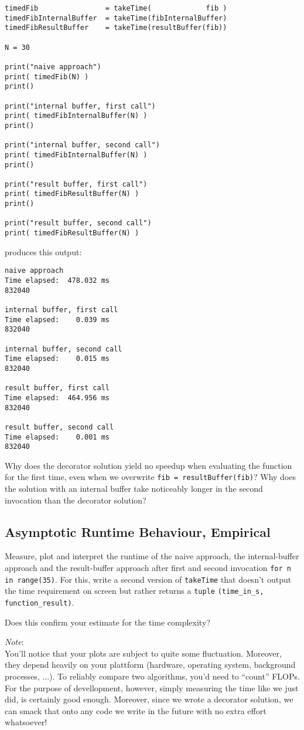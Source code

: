 \documentclass[
	english,
	fontsize=10pt,
	parskip=half,
	titlepage=true,
	DIV=12
]{scrartcl}
\newcommand*{\inPy}[1]{\texttt{#1}}
\begin{document}
\begin{verbatim}
timedFib                = takeTime(             fib )
timedFibInternalBuffer  = takeTime(fibInternalBuffer)
timedFibResultBuffer    = takeTime(resultBuffer(fib))

N = 30

print("naive approach")
print( timedFib(N) )
print()

print("internal buffer, first call")
print( timedFibInternalBuffer(N) )
print()

print("internal buffer, second call")
print( timedFibInternalBuffer(N) )
print()

print("result buffer, first call")
print( timedFibResultBuffer(N) )
print()

print("result buffer, second call")
print( timedFibResultBuffer(N) )
\end{verbatim}

produces this output:

\begin{verbatim}
naive approach
Time elapsed:  478.032 ms
832040

internal buffer, first call
Time elapsed:    0.039 ms
832040

internal buffer, second call
Time elapsed:    0.015 ms
832040

result buffer, first call
Time elapsed:  464.956 ms
832040

result buffer, second call
Time elapsed:    0.001 ms
832040
\end{verbatim}

Why does the decorator solution yield no speedup when evaluating the function for the first time, even when we overwrite \texttt{fib = resultBuffer(fib)}? Why does the solution with an internal buffer take noticeably longer in the second invocation than the decorator solution?


\subsection{Asymptotic Runtime Behaviour, Empirical}
Measure, plot and interpret the runtime of the naive approach, the internal-buffer approach and the result-buffer approach after first and second invocation 
\inPy{for n in range(35)}. For this, write a second version of \texttt{takeTime} that doesn't output the time requirement on screen but rather returns a \inPy{tuple} \texttt{(time\_in\_s, function\_result)}.

Does this confirm your estimate for the time complexity?

\emph{Note}:\\
You'll notice that your plots are subject to quite some fluctuation. Moreover, they depend heavily on your plattform (hardware, operating system, background processes, ...). To reliably compare two algorithms, you'd need to \enquote{count} FLOPs. For the purpose of devellopment, however, simply measuring the time like we just did, is certainly good enough. Moreover, since we wrote a decorator solution, we can smack that onto any code we write in the future with no extra effort whatsoever!
\end{document}
